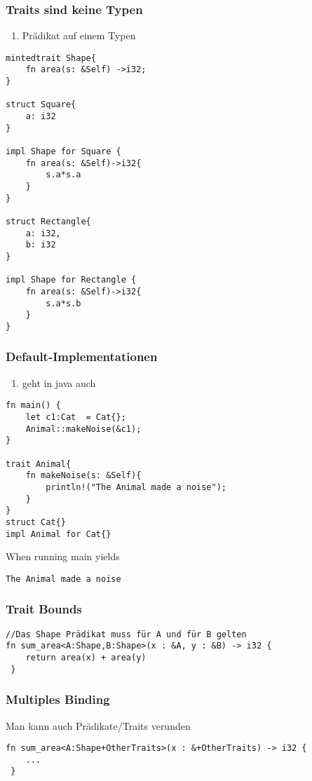 \documentclass[a4paper, 1ppt]{article}
\begin{document}
\subsubsection{Traits sind keine Typen}
\begin{enumerate}
		\item Prädikat auf einem Typen
\end{enumerate}

\begin{verbatim}
mintedtrait Shape{
    fn area(s: &Self) ->i32;
}

struct Square{
    a: i32
}

impl Shape for Square {
    fn area(s: &Self)->i32{
        s.a*s.a
    }
}

struct Rectangle{
    a: i32,
    b: i32
}

impl Shape for Rectangle {
    fn area(s: &Self)->i32{
        s.a*s.b
    }
}

\end{verbatim}
\subsubsection{Default-Implementationen}
\begin{enumerate}
	\item geht in java auch
\end{enumerate}
\begin{verbatim}
fn main() {
    let c1:Cat  = Cat{};
    Animal::makeNoise(&c1);
}

trait Animal{
    fn makeNoise(s: &Self){
        println!("The Animal made a noise");
    }
}
struct Cat{}
impl Animal for Cat{}
\end{verbatim}
When running main yields
\begin{verbatim}
The Animal made a noise
\end{verbatim}
\subsubsection{Trait Bounds}
\begin{verbatim}
//Das Shape Prädikat muss für A und für B gelten
fn sum_area<A:Shape,B:Shape>(x : &A, y : &B) -> i32 {
    return area(x) + area(y)
 }
\end{verbatim}
\subsubsection{Multiples Binding}
Man kann auch Prädikate/Traits verunden
\begin{verbatim}
fn sum_area<A:Shape+OtherTraits>(x : &+OtherTraits) -> i32 {
	...
 }
\end{verbatim}
\end{document}
